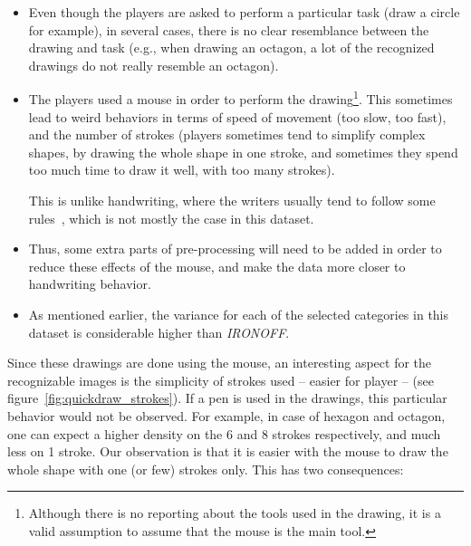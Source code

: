 \begin{itemize}
    \item Even though the players are asked to perform a particular task (draw a circle for example), in several cases, there is no clear resemblance between the drawing and task (e.g., when drawing an octagon, a lot of the recognized drawings do not really resemble an octagon).

    \item The players used a mouse in order to perform the drawing\footnote{Although there is no reporting about the tools used in the drawing, it is a valid assumption to assume that the mouse is the main tool.}. This sometimes lead to weird behaviors in terms of speed of movement (too slow, too fast), and the number of strokes (players sometimes tend to simplify complex shapes, by drawing the whole shape in one stroke, and sometimes they spend too much time to draw it well, with too many strokes).

    This is unlike handwriting, where the writers usually tend to follow some rules~\citep{seraphin2019analyzing}, which is not mostly the case in this dataset.

    \item Thus, some extra parts of pre-processing will need to be added in order to reduce these effects of the mouse, and make the data more closer to handwriting behavior.

    \item As mentioned earlier, the variance for each of the selected categories in this dataset is considerable higher than \textit{IRONOFF}.
\end{itemize}


\par Since these drawings are done using the mouse, an interesting aspect for the recognizable images is the simplicity of strokes used -- easier for player -- (see figure~\ref{fig:quickdraw_strokes}). If a pen is used in the drawings, this particular behavior would not be observed. For example, in case of hexagon and octagon, one can expect a higher density on the 6 and 8 strokes respectively, and much less on 1 stroke. Our observation is that it is easier with the mouse to draw the whole shape with one (or few) strokes only. This has two consequences:

